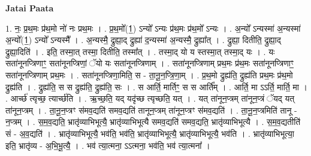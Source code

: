\documentclass[17pt]{extarticle}
\begin{document}
\textbf{Jatai Paata} \newline

1. नः॒ प्र॒थ॒मः प्र॑थ॒मो नो॑ नः प्रथ॒मः । . प्र॒थ॒मो᳚(1॒) ऽन्यो᳚ ऽन्यः प्र॑थ॒मः प्र॑थ॒मो᳚ ऽन्यः । . अ॒न्यो᳚ ऽन्यस्मा॑ अ॒न्यस्मा॑ अ॒न्यो᳚(1॒) ऽन्यो᳚ ऽन्यस्मै᳚ । . अ॒न्यस्मै॒ द्रुह्या॒द् द्रुह्या॑ द॒न्यस्मा॑ अ॒न्यस्मै॒ द्रुह्या᳚त् । . द्रुह्या॒ दितीति॒ द्रुह्या॒द् द्रुह्या॒दिति॑ । . इति॒ तस्मा॒त् तस्मा॒ दितीति॒ तस्मा᳚त् । . तस्मा॒द् यो य स्तस्मा॒त् तस्मा॒द् यः । . यः सता॑नूनप्त्रिणाꣳ॒॒ सता॑नूनप्त्रिणां॒ ॅयो यः सता॑नूनप्त्रिणाम् । . सता॑नूनप्त्रिणाम् प्रथ॒मः प्र॑थ॒मः सता॑नूनप्त्रिणाꣳ॒॒ सता॑नूनप्त्रिणाम् प्रथ॒मः । . सता॑नूनप्त्रिणा॒मिति॒ स - ता॒नू॒न॒प्त्रि॒णा॒म् । . प्र॒थ॒मो द्रुह्य॑ति॒ द्रुह्य॑ति प्रथ॒मः प्र॑थ॒मो द्रुह्य॑ति । . द्रुह्य॑ति॒ स स द्रुह्य॑ति॒ द्रुह्य॑ति॒ सः । . स आर्ति॒ मार्तिꣳ॒॒ स स आर्ति᳚म् । . आर्ति॒ मा ऽऽर्ति॒ मार्ति॒ मा । . आर्च्छ॑ त्यृच्छ॒ त्यार्च्छ॑ति । . ऋ॒च्छ॒ति॒ यद् यदृ॑च्छ त्यृच्छति॒ यत् । . यत् ता॑नून॒प्त्रम् ता॑नून॒प्त्रं ॅयद् यत् ता॑नून॒प्त्रम् । . ता॒नू॒न॒प्त्रꣳ स॑मव॒द्यति॑ समव॒द्यति॑ तानून॒प्त्रम् ता॑नून॒प्त्रꣳ स॑मव॒द्यति॑ । . ता॒नू॒न॒प्त्रमिति॑ तानू - न॒प्त्रम् । . स॒म॒व॒द्यति॒ भ्रातृ॑व्याभिभूत्यै॒ भ्रातृ॑व्याभिभूत्यै समव॒द्यति॑ समव॒द्यति॒ भ्रातृ॑व्याभिभूत्यै । . स॒म॒व॒द्यतीति॑ सं - अ॒व॒द्यति॑ । . भ्रातृ॑व्याभिभूत्यै॒ भव॑ति॒ भव॑ति॒ भ्रातृ॑व्याभिभूत्यै॒ भ्रातृ॑व्याभिभूत्यै॒ भव॑ति । . भ्रातृ॑व्याभिभूत्या॒ इति॒ भ्रातृ॑व्य - अ॒भि॒भू॒त्यै॒ । . भव॑ त्या॒त्मना॒ ऽऽत्मना॒ भव॑ति॒ भव॑ त्या॒त्मना᳚ । \newline
\end{document}

